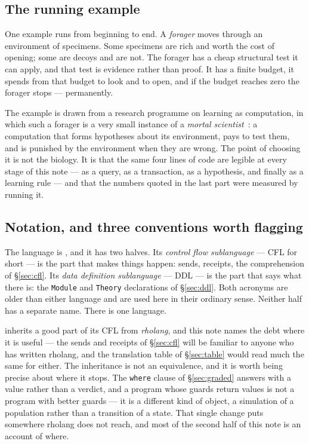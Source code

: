 \subsection{The running example}

One example runs from beginning to end. A \emph{forager} moves through an
environment of specimens. Some specimens are rich and worth the cost of opening;
some are decoys and are not. The forager has a cheap structural test it can
apply, and that test is evidence rather than proof. It has a finite budget, it
spends from that budget to look and to open, and if the budget reaches zero the
forager stops --- permanently.

The example is drawn from a research programme on learning as computation, in
which such a forager is a very small instance of a \emph{mortal
scientist}~\cite{ScientistNote}: a
computation that forms hypotheses about its environment, pays to test them, and
is punished by the environment when they are wrong. The point of choosing it is
not the biology. It is that the same four lines of code are legible at every
stage of this note --- as a query, as a transaction, as a hypothesis, and
finally as a learning rule --- and that the numbers quoted in the last part were
measured by running it.

\subsection{Notation, and three conventions worth flagging}

The language is \flang{}, and it has two halves. Its \emph{control flow
sublanguage} --- CFL for short --- is the part that makes things happen: sends,
receipts, the comprehension of \S\ref{sec:cfl}. Its \emph{data definition
sublanguage} --- DDL --- is the part that says what there is: the
\texttt{Module} and \texttt{Theory} declarations of \S\ref{sec:ddl}. Both
acronyms are older than either language and are used here in their ordinary
sense. Neither half has a separate name. There is one language.

\flang{} inherits a good part of its CFL from \emph{rholang}, and this note
names the debt where it is useful --- the sends and receipts of \S\ref{sec:cfl}
will be familiar to anyone who has written rholang, and the translation table
of \S\ref{sec:table} would read much the same for either. The inheritance is
not an equivalence, and it is worth being precise about where it stops. The
\texttt{where} clause of \S\ref{sec:graded} answers with a value rather than a
verdict, and a program whose guards return values is not a program with better
guards --- it is a different kind of object, a simulation of a population
rather than a transition of a state. That single change puts \flang{} somewhere
rholang does not reach, and most of the second half of this note is an account
of where.

